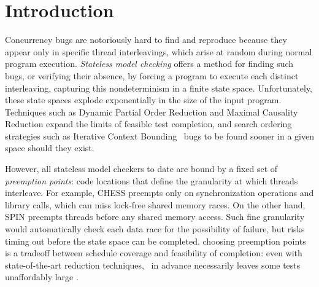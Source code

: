 \section{Introduction}

Concurrency bugs are notoriously hard to find and reproduce because they appear only in specific thread interleavings, which arise at random during normal program execution.
{\em Stateless model checking} \cite{verisoft} offers a method for finding such bugs,
or verifying their absence,
by forcing a program to execute each distinct interleaving,
capturing
this nondeterminism in a finite state space.
Unfortunately, these state spaces explode exponentially in the size of the input program.
Techniques such as Dynamic Partial Order Reduction \cite{dpor} and Maximal Causality Reduction \cite{mcr} expand the limits of feasible test completion,
and search ordering strategies such as Iterative Context Bounding \cite{chess-icb} ~bugs to be found sooner in a given space should they exist.

However, all stateless model checkers to date are bound by a fixed set of {\em preemption points}: code locations that define the granularity at which threads interleave.
For example, \textsc{CHESS} \cite{chess}  preempts only on synchronization operations and library calls, which can miss lock-free shared memory races.
%
On the other hand, SPIN \cite{spin} %
preempts threads before any shared memory access.
Such fine granularity would automatically check each data race for the possibility of failure, but risks timing out before the state space can be completed. %
choosing preemption points is a tradeoff between schedule coverage and feasibility of completion:
even with state-of-the-art reduction techniques,
~in advance necessarily leaves some tests unaffordably large \cite{parrot,mcr}.

